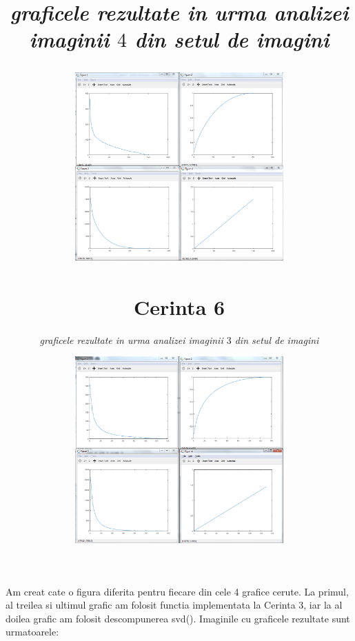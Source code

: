 \documentclass{article}
\begin{document}
{{\paragraph{}
Am creat cate o figura diferita pentru fiecare din cele 4 grafice cerute. La
primul, al treilea si ultimul grafic am folosit functia implementata la Cerinta
3, iar la al doilea grafic am folosit descompunerea svd(). Imaginile cu graficele rezultate sunt urmatoarele:
\bigbreak
\title{\textit{graficele rezultate in urma analizei imaginii $3$ din setul de imagini \\}
\begin{center}
\includegraphics[width=80mm]{grafice_task5_imaginea3.png}
\end{center}
\bigbreak
\title{\textit{graficele rezultate in urma analizei imaginii $4$ din setul de imagini \\}
\begin{center}
\includegraphics[width=80mm]{grafice_task5_imaginea4.png}
\end{center}

\section{Cerinta 6}
}}}}
\end{document}
